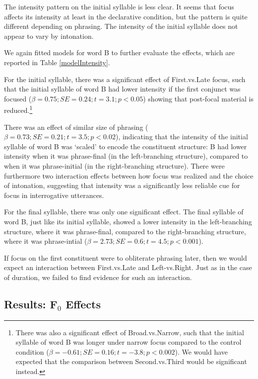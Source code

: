 \documentclass[preprint,review,12pt,authoryear,times]{elsarticle}
\begin{document}
The intensity pattern on the initial syllable is less clear. It seems that focus affects its intensity at least in the declarative condition, but the pattern is quite different depending on phrasing. The intensity of the initial syllable does not appear to vary by intonation. 

We again fitted models for word B to further evaluate the effects, which are reported in Table \ref{modelIntensity}.




For the initial syllable, there was a significant effect of First.vs.Late focus, such that the initial syllable of word B had lower intensity if the first conjunct was focused ($\beta=0.75; SE=0.24; t=3.1; p<0.05$) showing that post-focal material is reduced.\footnote{There was also a significant effect of Broad.vs.Narrow, such that the initial syllable of word B was longer under narrow focus compared to the control condition ($\beta=-0.61; SE=0.16; t=-3.8; p<0.002$). We would have expected that the comparison between Second.vs.Third would be significant instead.}

There was an effect of similar size of phrasing  ($\beta=0.73; SE=0.21; t=3.5; p<0.02$), indicating that the intensity of the initial syllable of word B was `scaled' to encode the constituent structure: B had lower intensity when it was phrase-final (in the left-branching structure), compared to when it was phrase-initial (in the right-branching structure). There were furthermore two interaction effects between how focus was realized and the choice of intonation, suggesting that intensity was a significantly less reliable cue for focus in interrogative utterances.

For the final syllable, there was only one significant effect. The final syllable of word B, just like its initial syllable, showed a lower intensity in the left-branching structure, where it was phrase-final,  compared to the right-branching structure, where it was phrase-intial ($\beta=2.73; SE=0.6; t=4.5; p<0.001$).  

If focus on the first constituent were to obliterate phrasing later, then we would expect an interaction between First.vs.Late and Left-vs.Right. Just as in the case of duration, we failed to find evidence for such an interaction.


\subsection{Results: F$_0$ Effects}
\end{document}
